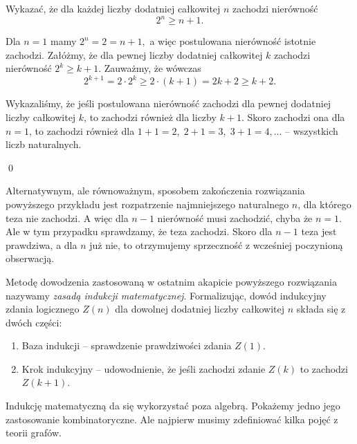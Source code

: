 


\noindent
Wykazać, że dla każdej liczby dodatniej całkowitej $n$ zachodzi nierówność
\[
	2^n \geqslant n + 1.
\]


\noindent
Dla $n = 1$ mamy $2^n = 2 = n + 1,$ a więc postulowana nierówność istotnie zachodzi.
Załóżmy, że dla pewnej liczby dodatniej całkowitej $k$ zachodzi nierówność ${2^k \geqslant k + 1}$. Zauważmy, że wówczas
\[
	2^{k + 1} = 2 \cdot 2^k \geqslant 2 \cdot (k + 1) = 2k + 2 \geqslant k + 2.
\]

\noindent
Wykazaliśmy, że jeśli postulowana nierówność zachodzi dla pewnej dodatniej liczby całkowitej $k$, to zachodzi również dla liczby $k + 1$. Skoro zachodzi ona dla $n = 1$, to zachodzi również dla $1 + 1 = 2,\; 2 + 1 = 3,\; 3 + 1 = 4, ...$ -- wszystkich liczb naturalnych.

\qed

\vspace{10px}

\noindent
Alternatywnym, ale równoważnym, sposobem zakończenia rozwiązania powyższego przykładu jest rozpatrzenie najmniejszego naturalnego $n$, dla którego teza nie zachodzi. A więc dla $n - 1$ nierówność musi zachodzić, chyba że $n = 1$. Ale w tym przypadku sprawdzamy, że teza zachodzi. Skoro dla $n - 1$ teza jest prawdziwa, a dla $n$ już nie, to otrzymujemy sprzeczność z wcześniej poczynioną obserwacją.

\vspace{10px}

\noindent
Metodę dowodzenia zastosowaną w ostatnim akapicie powyższego rozwiązania nazywamy \textit{zasadą indukcji matematycznej}.
Formalizując, dowód indukcyjny zdania logicznego $Z(n)$ dla dowolnej dodatniej liczby całkowitej $n$ składa się z dwóch części:
\begin{enumerate}
	\item Baza indukcji -- sprawdzenie prawdziwości zdania $Z(1)$.
	\item Krok indukcyjny -- udowodnienie, że jeśli zachodzi zdanie $Z(k)$ to zachodzi $Z(k + 1)$.
\end{enumerate}


\noindent
Indukcję matematyczną da się wykorzystać poza algebrą. Pokażemy jedno jego zastosowanie kombinatoryczne. Ale najpierw musimy zdefiniować kilka pojęć z teorii grafów.

